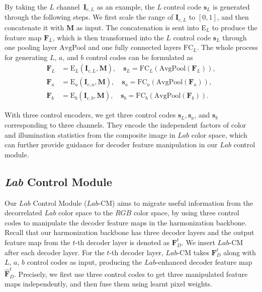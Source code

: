 \documentclass[sigconf]{acmart}
\begin{document}
By taking the $L$ channel~$\bm{I}_{c, \textit{L}}$ as an example, the \textit{L} control code $\bm{s}_{\textit{L}}$ is generated through the following steps. 
We first scale the range of $\bm{I}_{c, \textit{L}}$ to $[0, 1]$, and then concatenate it with $\bm{M}$ as input. The concatenation is sent into E$_{\textit{L}}$ to produce the feature map $\bm{F}_{L}$, which is then transformed into the $\textit{L}$ control code $\bm{s}_{L}$  through one pooling layer $\text{AvgPool}$ and one fully connected layers $\text{FC}_{\textit{L}}$.
The whole process for generating $L$, $a$, and $b$ control codes can be formulated as
\begin{equation}
    \begin{aligned}
      \bm{F}_{\textit{L}} &= \text{E}_{\textit{L}}(\bm{I}_{c, \textit{L}}, \bm{M}), \quad \bm{s}_{\textit{L}} = \text{FC}_{\textit{L}}(\text{AvgPool}(\bm{F}_{\textit{L}})), \\
      \bm{F}_{\textit{a}} &= \text{E}_{\textit{a}}(\bm{I}_{c, \textit{a}}, \bm{M}), \quad \bm{s}_{\textit{a}} = \text{FC}_{\textit{a}}(\text{AvgPool}(\bm{F}_{\textit{a}})), \\
      \bm{F}_{\textit{b}} &= \text{E}_{\textit{b}}(\bm{I}_{c, \textit{b}}, \bm{M}), \quad \bm{s}_{\textit{b}} = \text{FC}_{\textit{b}}(\text{AvgPool}(\bm{F}_{\textit{b}})).
    \end{aligned}
\end{equation}

With three control encoders, we get three control codes $\bm{s}_{\textit{L}}, \bm{s}_{\textit{a}}$, and $\bm{s}_{\textit{b}}$ corresponding to three channels. 
They encode the independent factors of color and illumination statistics from the composite image in $Lab$ color space, which can further provide guidance for decoder feature manipulation in our $Lab$ control module.

\subsection{\textit{Lab} Control Module}\label{Color transfer Module}
Our $Lab$ Control Module ($Lab$-CM) aims to migrate useful information from the decorrelated $Lab$ color space to the $RGB$ color space, by using three control codes to manipulate the decoder feature maps in the harmonization backbone. 
Recall that our harmonization backbone has three decoder layers and the output feature map from the $t$-th decoder layer is denoted as $\bm{F}_{D}^{t}$. We insert $Lab$-CM after each decoder layer. 
For the $t$-th decoder layer, $Lab$-CM takes $\bm{F}_{D}^{t}$ along with $L$, $a$, $b$ control codes as input, producing the $Lab$-enhanced decoder feature map~$\bm{\hat{F}}_{D}^t$. Precisely, we first use three control codes to get three manipulated feature maps independently, and then fuse them using learnt pixel weights.  
\end{document}
